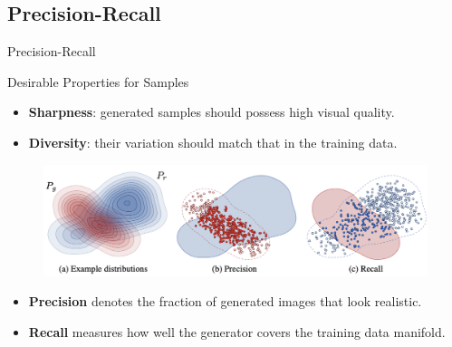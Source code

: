 \documentclass{beamer}
\begin{document}
\subsection{Precision-Recall}
\begin{frame}{Precision-Recall}
	\vspace{-0.5cm}
	\begin{block}{Desirable Properties for Samples}
		\begin{itemize}
			\item \textbf{Sharpness}: generated samples should possess high visual quality.
			\item \textbf{Diversity}: their variation should match that in the training data.
		\end{itemize}
	\end{block}
	\eqpause
	\vspace{-0.5cm}
	\begin{figure}
		\includegraphics[width=0.9\linewidth]{figs/pr_curve}
	\end{figure}
	\vspace{-0.3cm}
	\begin{itemize}
		\item \textbf{Precision} denotes the fraction of generated images that look realistic.
		\item \textbf{Recall} measures how well the generator covers the training data manifold.
	\end{itemize}
\end{frame}
\end{document}
